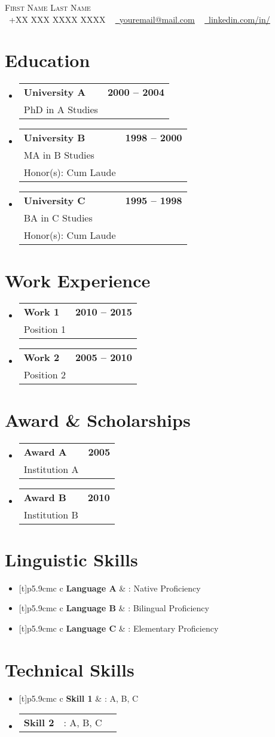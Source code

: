 \documentclass[A4,11pt]{article}
\makeatletter
\newcommand{\resumeSubheadingA}[5]{
  \vspace{-2pt}\item
    \begin{tabular*}{1.0\textwidth}[t]{l@{\extracolsep{\fill}}r}
      \textbf{#1} & \textbf{\small #2} \\
      \textup{#3} & \textit{\small #4} \\
      \textup{\small #5}
    \end{tabular*}\vspace{-1pt}
}
\newcommand{\resumeSubheadingB}[3]{
	\vspace{-2pt}\item
	\begin{tabular*}{1.0\textwidth}[t]{l@{\extracolsep{\fill}}r}
		\textbf{#1} & \textbf{\small #2} \\
		\textup{#3}
	\end{tabular*}\vspace{-3pt}
}
\newcommand{\Skillitem}[2]{
	\vspace{-2pt}\item
	\begin{tabular*}{\linewidth}[t]{p{5.9cm}c c}
		\textbf{#1} & \textup{#2} \\
	\end{tabular*}\vspace{-15pt}
}
\newcommand{\resumeSubHeadingListStart}{\begin{itemize}[leftmargin=0.0in, label={}]}
\newcommand{\resumeSubHeadingListEnd}{\end{itemize}}\vspace{-5pt}
\makeatother
\begin{document}
\begin{center}
    {\Huge \scshape First Name Last Name} \\ \vspace{10pt}
    \small \raisebox{-0.1\height}\faPhone\ +XX XXX XXXX XXXX ~ \href{mailto:youremail@mail.com}{\raisebox{-0.2\height}\faEnvelope\  \underline{youremail@mail.com}} ~ 
    \href{https://linkedin.com/in//}{\raisebox{-0.2\height}\faLinkedin\ \underline{linkedin.com/in/}}  ~
    \vspace{1pt}
\end{center}


\section{Education}
  \resumeSubHeadingListStart
    \resumeSubheadingB
	{University A}{2000 -- 2004}
	{PhD in A Studies}{}
    \resumeSubheadingA
    {University B}{1998 -- 2000}
    {MA in B Studies}{}
    {Honor(s): Cum Laude}
    \resumeSubheadingA
    {University C}{1995 -- 1998}
	{BA in C Studies}{}
	{Honor(s): Cum Laude}
\resumeSubHeadingListEnd

\section{Work Experience}
\resumeSubHeadingListStart
	\resumeSubheadingB
	{Work 1}{2010 -- 2015}
	{Position 1}
	\resumeSubheadingB
	{Work 2}{2005 -- 2010}
	{Position 2}
\resumeSubHeadingListEnd

\section{Award \& Scholarships}
\resumeSubHeadingListStart
	\resumeSubheadingB
	{Award A}{2005}
	{Institution A}
	\resumeSubheadingB
	{Award B}{2010}
	{Institution B}
\resumeSubHeadingListEnd

\section{Linguistic Skills}
\resumeSubHeadingListStart
	\Skillitem
	{Language A}{: Native Proficiency}
	\Skillitem
	{Language B}{: Bilingual Proficiency}
	\Skillitem
	{Language C}{: Elementary Proficiency}
\resumeSubHeadingListEnd

\vspace{0pt}\section{Technical Skills}
\resumeSubHeadingListStart
	\Skillitem
	{Skill 1}{: A, B, C}
	\Skillitem
	{Skill 2}{: A, B, C}
\resumeSubHeadingListEnd
                                                      
\end{document}
